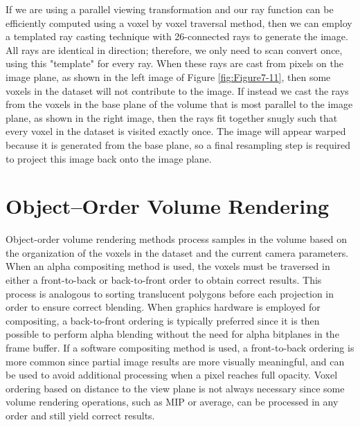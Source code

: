 If we are using a parallel viewing transformation and our ray function can be efficiently computed using a voxel by voxel traversal method, then we can employ a templated ray casting technique \cite{Yagel92b} with 26-connected rays to generate the image. All rays are identical in direction; therefore, we only need to scan convert once, using this "template" for every ray. When these rays are cast from pixels on the image plane, as shown in the left image of Figure \ref{fig:Figure7-11}, then some voxels in the dataset will not contribute to the image. If instead we cast the rays from the voxels in the base plane of the volume that is most parallel to the image plane, as shown in the right image, then the rays fit together snugly such that every voxel in the dataset is visited exactly once. The image will appear warped because it is generated from the base plane, so a final resampling step is required to project this image back onto the image plane.

\section{Object--Order Volume Rendering}

Object-order volume rendering methods process samples in the volume based on the organization of the voxels in the dataset and the current camera parameters. When an alpha compositing method is used, the voxels must be traversed in either a front-to-back or back-to-front order to obtain correct results. This process is analogous to sorting translucent polygons before each projection in order to ensure correct blending. When graphics hardware is employed for compositing, a back-to-front ordering is typically preferred since it is then possible to perform alpha blending without the need for alpha bitplanes in the frame buffer. If a software compositing method is used, a front-to-back ordering is more common since partial image results are more visually meaningful, and can be used to avoid additional processing when a pixel reaches full opacity. Voxel ordering based on distance to the view plane is not always necessary since some volume rendering operations, such as MIP or average, can be processed in any order and still yield correct results.

